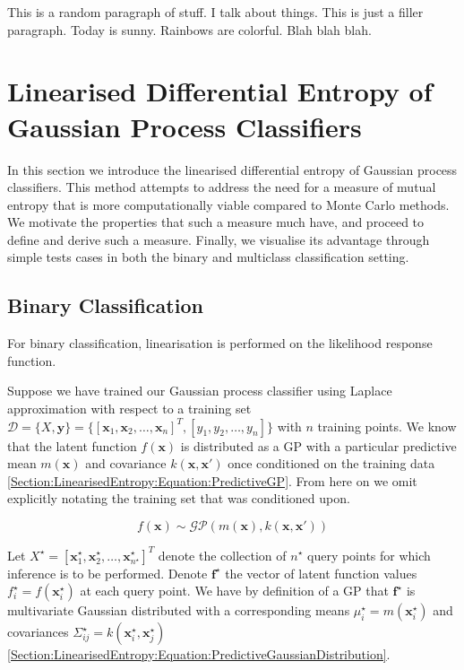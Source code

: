 \documentclass{article}
\renewcommand{\vec}[1]{\boldsymbol{#1}}
\begin{document}
		{\color{BurntOrange} This is a random paragraph of stuff. I talk about things. This is just a filler paragraph. Today is sunny. Rainbows are colorful. Blah blah blah.}
		
\section{Linearised Differential Entropy of Gaussian Process Classifiers}
\label{Section:LinearisedEntropy}

	In this section we introduce the linearised differential entropy of Gaussian process classifiers. This method attempts to address the need for a measure of mutual entropy that is more computationally viable compared to Monte Carlo methods. We motivate the properties that such a measure much have, and proceed to define and derive such a measure. Finally, we visualise its advantage through simple tests cases in both the binary and multiclass classification setting.
	
	\subsection{Binary Classification}

		For binary classification, linearisation is performed on the likelihood response function.
	
		Suppose we have trained our Gaussian process classifier using Laplace approximation with respect to a training set $\mathcal{D} = \{X, \vec{y}\} = \{[ \vec{x}_{1}, \vec{x}_{2}, \dots, \vec{x}_{n}]^{T}, [y_{1}, y_{2}, \dots, y_{n}]\}$ with $n$ training points. We know that the latent function $f(\vec{x})$ is distributed as a GP with a particular predictive mean $m(\vec{x})$ and covariance $k(\vec{x}, \vec{x}')$ once conditioned on the training data \eqref{Section:LinearisedEntropy:Equation:PredictiveGP}. From here on we omit explicitly notating the training set that was conditioned upon.
		
		\begin{equation}
			f(\vec{x}) \sim \mathcal{GP}(m(\vec{x}), k(\vec{x}, \vec{x}'))
		\label{Section:LinearisedEntropy:Equation:PredictiveGP}
		\end{equation}
		
		Let $X^{\star} = [ \vec{x}^{\star}_{1}, \vec{x}^{\star}_{2}, \dots, \vec{x}^{\star}_{n^{\star}}]^{T}$ denote the collection of $n^{\star}$ query points for which inference is to be performed. Denote $\vec{f}^{\star}$ the vector of latent function values $f^{\star}_{i} = f(\vec{x}^{\star}_{i})$ at each query point. We have by definition of a GP that $\vec{f}^{\star}$ is multivariate Gaussian distributed with a corresponding means $\mu^{\star}_{i} = m(\vec{x}^{\star}_{i})$ and covariances $\Sigma^{\star}_{ij} = k(\vec{x}^{\star}_{i}, \vec{x}^{\star}_{j})$ \eqref{Section:LinearisedEntropy:Equation:PredictiveGaussianDistribution}.
		
\end{document}
